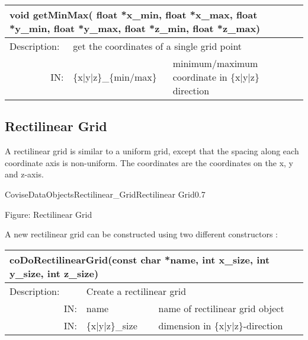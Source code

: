 \begin{htmlonly}
\begin{longtable}{|p{4cm}|p{3cm}|p{5cm}|}
\hline
\multicolumn{3}{|p{13.5cm}|}{\bf void getMinMax(  float   *x\_min,  float   *x\_max,\newline
           float   *y\_min,  float   *y\_max,\newline
	   float   *z\_min,  float   *z\_max)}\\
\hline
{Description:}  
           & \multicolumn{2}{p{9.5cm}|}{get the coordinates of a single grid point} \\
\hline
\multicolumn{1}{|r|}{IN:} & \multicolumn{1}{p{3cm}|}{\{x|y|z\}\_\{min/max\}} 
                          & \multicolumn{1}{p{5cm}|}{minimum/maximum coordinate 
			  in \{x|y|z\} direction}\endhead
\hline
\end{longtable}
\end{htmlonly}

\subsection{Rectilinear Grid}

A rectilinear grid is similar to a uniform grid, except that the spacing 
along each coordinate axis is non-uniform. The coordinates are the coordinates 
on the x, y and z-axis.


\begin{covimg}{CoviseDataObjects}{Rectilinear_Grid}{Rectilinear Grid}{0.7}\end{covimg}
\begin{htmlonly}
Figure: Rectilinear Grid
\end{htmlonly}
\vspace*{1cm}

A new rectilinear grid can be constructed using two different 
constructors :

\latexonly	     
\begin{longtable}{|p{4cm}|p{2.5cm}|p{7cm}|}
\hline
\multicolumn{3}{|p{13.5cm}|}{\bf  coDoRectilinearGrid(const char *name, int x\_size, int y\_size, int z\_size)}\\
\hline
{Description:}  
           & \multicolumn{2}{p{9.5cm}|}{Create a rectilinear grid} \\
\hline
\multicolumn{1}{|r|}{IN:} & \multicolumn{1}{p{3cm}|}{name} 
                          & \multicolumn{1}{p{5cm}|}{name of rectilinear grid object}\\
\hline
\multicolumn{1}{|r|}{IN:} & \multicolumn{1}{p{3cm}|}{\{x$\mid$y$\mid$z\}\_size} 
                          & \multicolumn{1}{p{5cm}|}{dimension in 
			  \{x$\mid$y$\mid$z\}-direction}\endhead
\hline
\end{longtable}
\endlatexonly

